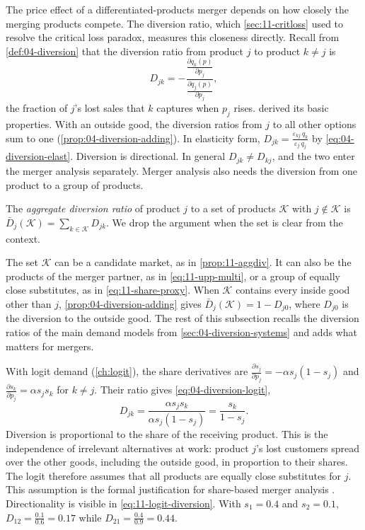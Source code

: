 The price effect of a differentiated-products merger depends on how closely the merging products compete. The
diversion ratio, which \cref{sec:11-critloss} used to resolve the critical loss paradox, measures this closeness
directly. Recall from \cref{def:04-diversion} that the diversion ratio from product $j$ to product $k \ne j$ is
\begin{equation*}
  D_{jk} = -\dfrac{\frac{\partial q_k(p)}{\partial p_j}}{\frac{\partial q_j(p)}{\partial p_j}} ,
\end{equation*}
the fraction of $j$'s lost sales that $k$ captures when $p_j$ rises. 
derived its basic properties. With an outside good, the diversion ratios from $j$ to all other options sum to one
(\cref{prop:04-diversion-adding}). In elasticity form, $D_{jk} = \frac{\varepsilon_{kj}\,q_k}{\varepsilon_j\,q_j}$ by
\eqref{eq:04-diversion-elast}. Diversion is directional. In general $D_{jk} \ne D_{kj}$, and the two enter the merger
analysis separately. Merger analysis also needs the diversion from one product to a group of products.

\begin{definition}\label{def:11-aggdiv}
The \emph{aggregate diversion ratio} of product $j$ to a set of products $\mathcal{K}$ with $j \notin \mathcal{K}$ is
$\bar D_j(\mathcal{K}) = \sum_{k \in \mathcal{K}} D_{jk}$. We drop the argument when the set is clear from the context.
\end{definition}

The set $\mathcal{K}$ can be a candidate market, as in \cref{prop:11-aggdiv}. It can also be the products of the
merger partner, as in \eqref{eq:11-upp-multi}, or a group of equally close substitutes, as in
\eqref{eq:11-share-proxy}. When $\mathcal{K}$ contains every inside good other than $j$, \cref{prop:04-diversion-adding}
gives $\bar D_j(\mathcal{K}) = 1 - D_{j0}$, where $D_{j0}$ is the diversion to the outside good. The rest of this
subsection recalls the diversion ratios of the main demand models from \cref{sec:04-diversion-systems} and adds what
matters for mergers.

 With logit demand (\cref{ch:logit}), the share derivatives are
$\frac{\partial s_j}{\partial p_j} = -\alpha s_j (1 - s_j)$ and $\frac{\partial s_k}{\partial p_j} = \alpha s_j s_k$
for $k \ne j$. Their ratio gives \eqref{eq:04-diversion-logit},
\begin{equation}\label{eq:11-logit-diversion}
  D_{jk} = \frac{\alpha s_j s_k}{\alpha s_j (1 - s_j)} = \frac{s_k}{1 - s_j} .
\end{equation}
Diversion is proportional to the share of the receiving product. This is the independence of irrelevant
alternatives at work: product $j$'s lost customers spread over the other goods, including the outside good, in
proportion to their shares. The logit therefore assumes that all products are equally close substitutes for $j$.
This assumption is the formal justification for share-based merger analysis \citep{Willig1991}. Directionality is
visible in \eqref{eq:11-logit-diversion}. With $s_1 = 0.4$ and $s_2 = 0.1$, $D_{12} = \frac{0.1}{0.6} = 0.17$ while
$D_{21} = \frac{0.4}{0.9} = 0.44$.

